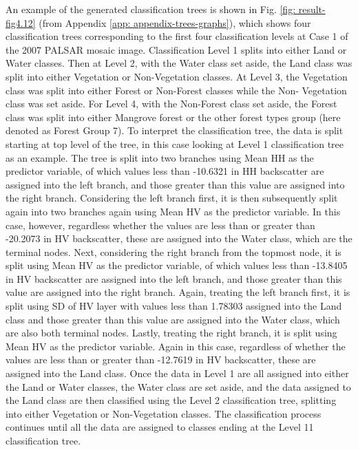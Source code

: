 An example of the generated classification trees is shown in Fig. \ref{fig: result-fig4.12} (from Appendix \ref{app: appendix-trees-graphs}), which shows four classification trees corresponding to the first four classification levels at Case 1 of the 2007 PALSAR mosaic image. Classification Level 1 splits into either Land or Water classes. Then at Level 2, with the Water class set aside, the Land class was split into either Vegetation or Non-Vegetation classes. At Level 3, the Vegetation class was split into either Forest or Non-Forest classes while the Non- Vegetation class was set aside. For Level 4, with the Non-Forest class set aside, the Forest class was split into either Mangrove forest or the other forest types group (here denoted as Forest Group 7). To interpret the classification tree, the data is split starting at top level of the tree, in this case looking at Level 1 classification tree as an example. The tree is split into two branches using Mean HH as the predictor variable, of which values less than -10.6321 in HH backscatter are assigned into the left branch, and those greater than this value are assigned into the right branch. Considering the left branch first, it is then subsequently split again into two branches again using Mean HV as the predictor variable. In this case, however, regardless whether the values are less than or greater than -20.2073 in HV backscatter, these are assigned into the Water class, which are the terminal nodes. Next, considering the right branch from the topmost node, it is split using Mean HV as the predictor variable, of which values less than -13.8405 in HV backscatter are assigned into the left branch, and those greater than this value are assigned into the right branch. Again, treating the left branch first, it is split using SD of HV layer with values less than 1.78303 assigned into the Land class and those greater than this value are assigned into the Water class, which are also both terminal nodes. Lastly, treating the right branch, it is split using Mean HV as the predictor variable. Again in this case, regardless of whether the values are less than or greater than -12.7619 in HV backscatter, these are assigned into the Land class. Once the data in Level 1 are all assigned into either the Land or Water classes, the Water class are set aside, and the data assigned to the Land class are then classified using the Level 2 classification tree, splitting into either Vegetation or Non-Vegetation classes. The classification process continues until all the data are assigned to classes ending at the Level 11 classification tree.

